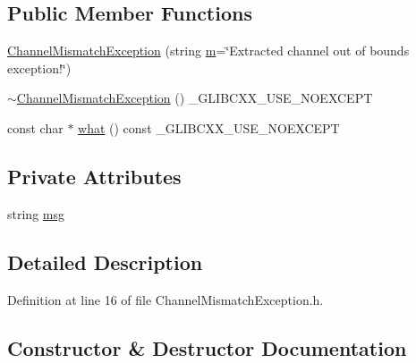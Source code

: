\subsection*{Public Member Functions}
\begin{DoxyCompactItemize}
\item 
\hyperlink{class_vision_1_1_exception_1_1_channel_mismatch_exception_a6fcbebd5e804c5b76b24506fe558d656}{Channel\+Mismatch\+Exception} (string \hyperlink{_gen_blob_8m_ab3cd915d758008bd19d0f2428fbb354a}{m}=\char`\"{}Extracted channel out of bounds exception!\char`\"{})
\item 
\hyperlink{class_vision_1_1_exception_1_1_channel_mismatch_exception_abef15b64f935832cc516696b68f6a012}{$\sim$\+Channel\+Mismatch\+Exception} () \+\_\+\+G\+L\+I\+B\+C\+X\+X\+\_\+\+U\+S\+E\+\_\+\+N\+O\+E\+X\+C\+E\+P\+T
\item 
const char $\ast$ \hyperlink{class_vision_1_1_exception_1_1_channel_mismatch_exception_acd5341496b3b5f49bba41c238a398a70}{what} () const \+\_\+\+G\+L\+I\+B\+C\+X\+X\+\_\+\+U\+S\+E\+\_\+\+N\+O\+E\+X\+C\+E\+P\+T
\end{DoxyCompactItemize}
\subsection*{Private Attributes}
\begin{DoxyCompactItemize}
\item 
string \hyperlink{class_vision_1_1_exception_1_1_channel_mismatch_exception_afa6ced18d6bf6cde0f907cb722470d60}{msg}
\end{DoxyCompactItemize}


\subsection{Detailed Description}


Definition at line 16 of file Channel\+Mismatch\+Exception.\+h.



\subsection{Constructor \& Destructor Documentation}
\hypertarget{class_vision_1_1_exception_1_1_channel_mismatch_exception_a6fcbebd5e804c5b76b24506fe558d656}{}
